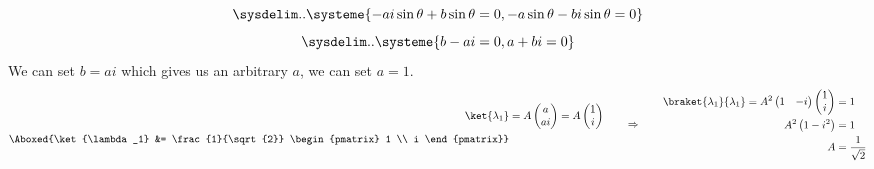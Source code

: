 \documentclass{article}
\begin{document}
	\begin{equation*}
		\sysdelim..\systeme{
			-ai\sin\theta + b\sin\theta = 0,
			-a\sin\theta - bi\sin\theta = 0
		}
	\end{equation*}
	\begin{equation*}
		\sysdelim..\systeme{
			b - ai = 0,
			a + bi = 0
		}
	\end{equation*}
	We can set $b=ai$ which gives us an arbitrary $a$, we can set $a=1$.
	\begin{equation*}
		\begin{split}
			\ket{\lambda_1} &= A \begin{pmatrix}
				a \\
				ai
			\end{pmatrix}
			= A \begin{pmatrix}
				1 \\
				i
			\end{pmatrix} \\
			\Aboxed{\ket{\lambda_1} &= \frac{1}{\sqrt{2}} \begin{pmatrix}
				1 \\
				i
			\end{pmatrix}}
		\end{split}
		\qquad \Rightarrow \qquad
		\begin{split}
			\braket{\lambda_1}{\lambda_1} = A^2 \begin{pmatrix}
				1 & -i 
			\end{pmatrix}
			\begin{pmatrix}
			1 \\
			i
			\end{pmatrix} &= 1 \\
			A^2 \left( 1 - i^2 \right) &= 1 \\
			A &= \frac{1}{\sqrt{2}}
		\end{split}
	\end{equation*}
	
\end{document}
